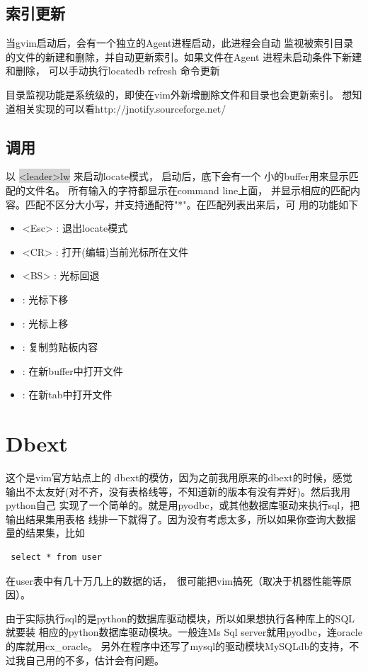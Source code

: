 \documentclass[oneside,openany]{book}
\begin{document}
\subsection{索引更新}
    当gvim启动后，会有一个独立的Agent进程启动，此进程会自动
监视被索引目录的文件的新建和删除，并自动更新索引。如果文件在Agent
进程未启动条件下新建和删除， 可以手动执行locatedb refresh 命令更新

   目录监视功能是系统级的，即使在vim外新增删除文件和目录也会更新索引。
想知道相关实现的可以看http://jnotify.sourceforge.net/

\subsection{调用}
   以 \colorbox{lightgray}{<leader>lw} 来启动locate模式， 启动后，底下会有一个
小的buffer用来显示匹配的文件名。 所有输入的字符都显示在command line上面，
并显示相应的匹配内容。匹配不区分大小写，并支持通配符"*"。在匹配列表出来后，可
用的功能如下
    \begin{itemize}
        \item <Esc> : 退出locate模式
        \item <CR>  : 打开(编辑)当前光标所在文件 
        \item <BS>  : 光标回退
        \item <C-j> : 光标下移
        \item <C-k> : 光标上移
        \item <C-v> : 复制剪贴板内容
        \item <C-b> : 在新buffer中打开文件
        \item <C-t> : 在新tab中打开文件
    \end{itemize}
    

\section{Dbext}

  这个是vim官方站点上的 dbext的模仿，因为之前我用原来的dbext的时候，感觉
输出不太友好(对不齐，没有表格线等，不知道新的版本有没有弄好)。然后我用python自己
实现了一个简单的。就是用pyodbc，或其他数据库驱动来执行sql，把输出结果集用表格
线排一下就得了。因为没有考虑太多，所以如果你查询大数据量的结果集，比如 
\begin{verbatim} select * from user \end{verbatim}
在user表中有几十万几上的数据的话，　很可能把vim搞死（取决于机器性能等原因）。

由于实际执行sql的是python的数据库驱动模块，所以如果想执行各种库上的SQL就要装
相应的python数据库驱动模块。一般连Ms Sql server就用pyodbc，连oracle的库就用cx\_oracle。
另外在程序中还写了mysql的驱动模块MySQLdb的支持，不过我自己用的不多，估计会有问题。
\end{document}
